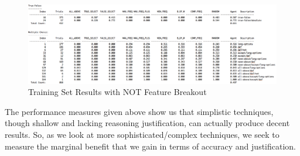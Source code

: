 \begin{figure}
\centering
\includegraphics[width=130mm]{version_1_training_set_results_not.png}
\caption{Training Set Results with NOT Feature Breakout}
\label{fig:version_1_training_set_results_not}
\end{figure}

The performance measures given above show us that simplistic techniques, though shallow and lacking reasoning justification, can actually produce decent results.  So, as we look at more sophisticated/complex techniques, we seek to measure the marginal benefit that we gain in terms of accuracy and justification.



